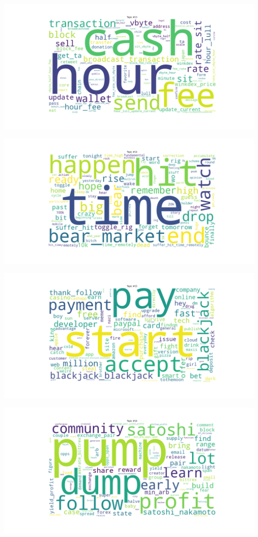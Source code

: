 \documentclass[
]{article}
\begin{document}
\pagebreak

\includegraphics{images/03 - Topic_13.png}

\pagebreak

\includegraphics{images/03 - Topic_14.png}

\pagebreak

\includegraphics{images/03 - Topic_15.png}

\pagebreak

\includegraphics{images/03 - Topic_16.png}
\end{document}
